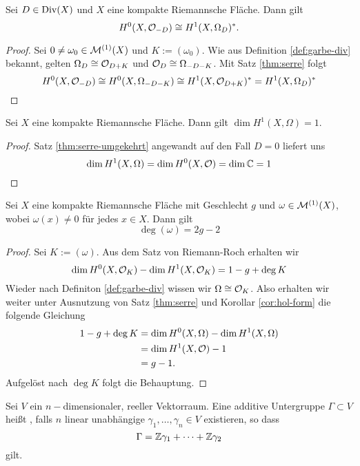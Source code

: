 \begin{thm}
  \label{thm:serre-umgekehrt}
  Sei $D \in \operatorname{Div}(X)$ und $X$ eine kompakte Riemannsche Fläche. Dann
  gilt
  \[
  H^0(X, \mathcal{O}_{-D}) \cong H^1(X, \Omega_D)^\ast.
  \]
\end{thm}

\begin{proof}
  Sei $0 \neq \omega_0 \in \mathcal{M}^{(1)}(X)$ und $K := (\omega_0)$. Wie
  aus Definition \ref{def:garbe-div} bekannt, gelten $\Omega_D \cong
  \mathcal{O}_{D+K}$ und $\mathcal{O}_D \cong \Omega_{-D-K}$. Mit Satz
  \ref{thm:serre} folgt
  \[
  H^0(X, \mathcal{O}_{-D}) \cong H^0(X, \Omega_{-D-K}) \cong H^1(X,
  \mathcal{O}_{D+K})^\ast = H^1(X, \Omega_D)^\ast
  \]
\end{proof}

\begin{cor}
  \label{cor:hol-form}
  Sei $X$ eine kompakte Riemannsche Fläche. Dann gilt $\dim H^1(X,
  \Omega) = 1$.
\end{cor}

\begin{proof}
  Satz \ref{thm:serre-umgekehrt} angewandt auf den Fall $D = 0$
  liefert uns
  \[
  \dim H^1(X, \Omega) = \dim H^0(X, \mathcal{O}) = \dim \mathbb{C} = 1
  \]
\end{proof}

\begin{thm}
  \label{thm:deg-geschlecht}
  Sei $X$ eine kompakte Riemannsche Fläche mit Geschlecht $g$ und $\omega
  \in \mathcal{M}^{(1)}(X)$, wobei $\omega(x) \neq 0$ für jedes $x \in
  X$. Dann gilt
  \[
  \deg(\omega) = 2g - 2
  \]
\end{thm}

\begin{proof}
  Sei $K := (\omega)$. Aus dem Satz von Riemann-Roch erhalten wir
  \[
  \dim H^0(X, \mathcal{O}_K) - \dim H^1(X, \mathcal{O}_K) = 1 - g + \deg K
  \]
  Wieder nach Definiton \ref{def:garbe-div} wissen wir $\Omega \cong
  \mathcal{O}_K$. Also erhalten wir weiter unter Ausnutzung von Satz
  \ref{thm:serre} und Korollar \ref{cor:hol-form} die folgende Gleichung
  \begin{align*}
    1 - g+ \deg K & = \dim H^0(X, \Omega) - \dim H^1(X, \Omega) \\
    & = \dim H^1(X, \mathcal{O}) - 1 \\
    & = g - 1.
  \end{align*}
  Aufgelöst nach $\deg K$ folgt die Behauptung.
\end{proof}

\begin{defin}
  \label{defin:gitter}
  Sei $V$ ein $n-$dimensionaler, reeller Vektorraum. Eine additive
  Untergruppe $\Gamma \subset V$ heißt , falls $n$ linear
  unabhängige $\gamma_1, \dots, \gamma_n \in V$ existieren, so dass
  \[
  \Gamma = \mathbb{Z} \gamma_1 + \dots + \mathbb{Z} \gamma_2
  \]
  gilt.
\end{defin}


